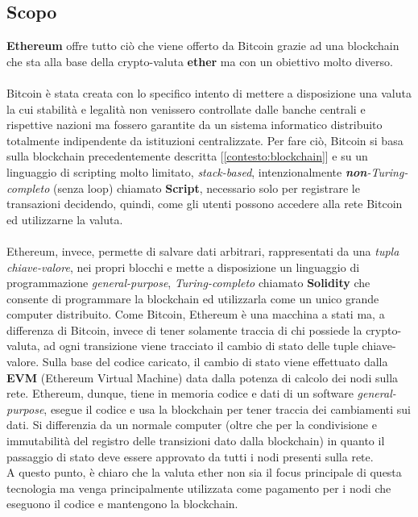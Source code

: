     \subsection{Scopo}
    \textbf{Ethereum} offre tutto ciò che viene offerto da Bitcoin grazie ad una blockchain che sta alla base della crypto-valuta \textbf{ether} ma con un obiettivo molto diverso.
    \\\\
    Bitcoin è stata creata con lo specifico intento di mettere a disposizione una valuta la cui stabilità e legalità non venissero controllate dalle banche centrali e rispettive nazioni ma fossero garantite da un sistema informatico distribuito totalmente indipendente da istituzioni centralizzate. Per fare ciò, Bitcoin si basa sulla blockchain precedentemente descritta [\autoref{contesto:blockchain}] e su un linguaggio di scripting molto limitato, \textit{stack-based}, intenzionalmente \textit{\textbf{non}-Turing-completo} (senza loop) chiamato \textbf{Script}, necessario solo per registrare le transazioni decidendo, quindi, come gli utenti possono accedere alla rete Bitcoin ed utilizzarne la valuta.
    \\\\
    Ethereum, invece, permette di salvare dati arbitrari, rappresentati da una \textit{tupla chiave-valore}, nei propri blocchi e mette a disposizione un linguaggio di programmazione \textit{general-purpose}, \textit{Turing-completo} chiamato \textbf{Solidity} che consente di programmare la blockchain ed utilizzarla come un unico grande computer distribuito. Come Bitcoin, Ethereum è una macchina a stati ma, a differenza di Bitcoin, invece di tener solamente traccia di chi possiede la crypto-valuta, ad ogni transizione viene tracciato il cambio di stato delle tuple chiave-valore. Sulla base del codice caricato, il cambio di stato viene effettuato dalla \textbf{EVM} (Ethereum Virtual Machine) data dalla potenza di calcolo dei nodi sulla rete. Ethereum, dunque, tiene in memoria codice e dati di un software \textit{general-purpose}, esegue il codice e usa la blockchain per tener traccia dei cambiamenti sui dati. Si differenzia da un normale computer (oltre che per la condivisione e immutabilità del registro delle transizioni dato dalla blockchain) in quanto il passaggio di stato deve essere approvato da tutti i nodi presenti sulla rete.\\
    A questo punto, è chiaro che la valuta ether non sia il focus principale di questa tecnologia ma venga principalmente utilizzata come pagamento per i nodi che eseguono il codice e mantengono la blockchain.

